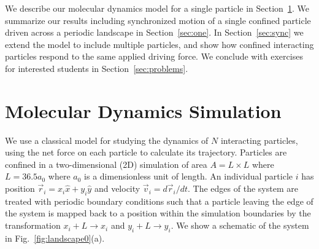 \documentclass[twocolumn,preprintnumbers,amsmath,amssymb,aps,prx]{revtex4}
\begin{document}

We describe
our molecular dynamics model for a single particle in Section~\ref{sec:MD}.
We summarize
our results 
including synchronized motion of a single confined particle
driven across a periodic landscape in 
Section~\ref{sec:one}.
In Section~\ref{sec:sync}
we 
extend the model to include multiple particles,
and show how confined 
interacting particles respond to the same applied driving force.
We conclude with
exercises for interested students 
in Section~\ref{sec:problems}.



\section{Molecular Dynamics Simulation}
\label{sec:MD}

We use a classical model for 
studying the dynamics of $N$ interacting particles,
using the net force on each particle to calculate
its trajectory.
Particles are confined in a two-dimensional (2D) 
simulation of area $A = L \times L$ where $L=36.5 a_0$
where $a_0$ is a dimensionless unit of length.
An individual particle $i$ has
position $\vec{r}_i = x_i \hat{x} + y_i \hat{y}$
and velocity $\vec{v}_i = d\vec{r}_i/dt$.
The edges of the system are treated with
periodic boundary conditions
such that a particle leaving the edge of the system is mapped
back to a position within the simulation boundaries 
by the transformation $x_i+L \rightarrow x_i$ and $y_i+L \rightarrow y_i$.
We show a schematic of the system in Fig.~\ref{fig:landscape0}(a).
\end{document}
